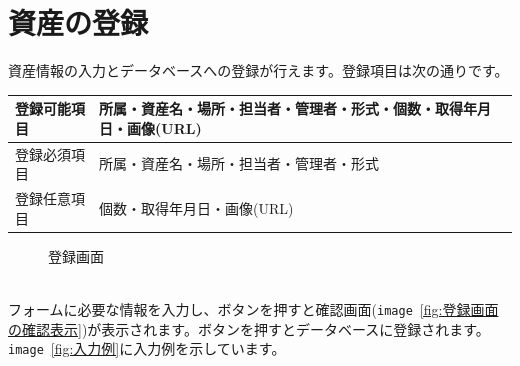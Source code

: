 \documentclass[11ptm]{jsarticle}
\begin{document}
\section{資産の登録}
\label{sec:資産の登録}
資産情報の入力とデータベースへの登録が行えます。登録項目は次の通りです。
\begin{table}[h]
  \centering
  \begin{tabular}{l|l}
    登録可能項目 & 所属・資産名・場所・担当者・管理者・形式・個数・取得年月日・画像(URL)
    \\\hline
    登録必須項目 & 所属・資産名・場所・担当者・管理者・形式
    \\\hline
    登録任意項目 & 個数・取得年月日・画像(URL)
  \end{tabular}
\end{table}
\begin{figure}[h]
  \centering
  \caption{\label{fig:登録画面}登録画面}
\end{figure}\\
フォームに必要な情報を入力し、ボタンを押すと確認画面({\tt image}\ \ref{fig:登録画面の確認表示})が表示されます。ボタンを押すとデータベースに登録されます。\\
{\tt image}\ \ref{fig:入力例}に入力例を示しています。
\end{document}
